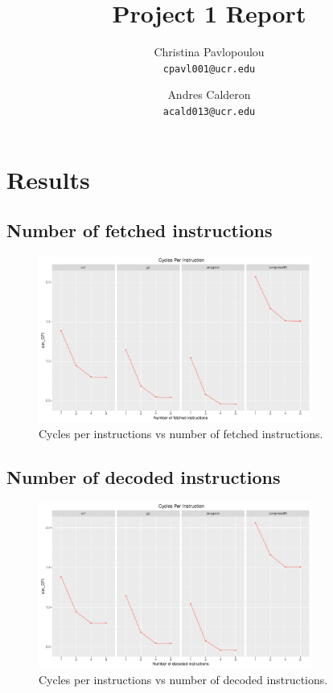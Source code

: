 \documentclass[10pt]{scrartcl}
\title{Project 1 Report}
\author{
   Christina Pavlopoulou\\
  \small \texttt{cpavl001@ucr.edu}
  \and
   Andres Calderon\\
  \small \texttt{acald013@ucr.edu}
}
\begin{document}
\maketitle


\section{Results}

\subsection{Number of fetched instructions}

\begin{figure}[h]
  \centering
  \includegraphics[width=0.8\textwidth]{Plots/plot_F_sim_CPI}
  \caption{Cycles per instructions vs number of fetched instructions.}\label{fig:f_sim_cpi}
\end{figure}

\FloatBarrier

\subsection{Number of decoded instructions}

\begin{figure}[h]
  \centering
  \includegraphics[width=0.8\textwidth]{Plots/plot_D_sim_CPI}
  \caption{Cycles per instructions vs number of decoded instructions.}\label{fig:d_sim_cpi}
\end{figure}
\end{document}
